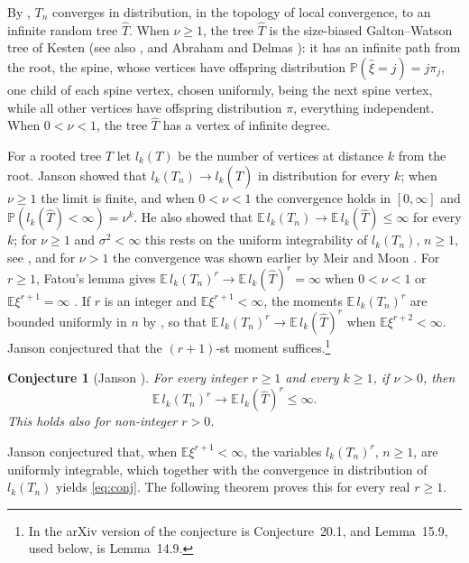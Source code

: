 \documentclass[11pt]{amsart}
\newtheorem*{conjecture*}{Conjecture}
\theoremstyle{remark}
\numberwithin{equation}{section}
\newcommand{\Pp}{\mathbb P}
\newcommand{\E}{\mathbb E}
\newcommand{\hT}{\widehat T}
\begin{document}
By \cite[Theorem~7.1]{J12}, $T_n$ converges in distribution, in the topology of local convergence, to an infinite random tree $\hT$. When $\nu\ge1$, the tree $\hT$ is the size-biased Galton--Watson tree of Kesten \cite{Kes86} (see also \cite{LPP95}, \cite[Section~5]{J12} and Abraham and Delmas \cite{AD14}): it has an infinite path from the root, the spine, whose vertices have offspring distribution $\Pp(\hat\xi=j)=j\pi_j$, one child of each spine vertex, chosen uniformly, being the next spine vertex, while all other vertices have offspring distribution $\pi$, everything independent. When $0<\nu<1$, the tree $\hT$ has a vertex of infinite degree.

For a rooted tree $T$ let $l_k(T)$ be the number of vertices at distance $k$ from the root. Janson \cite[Section~21.1]{J12} showed that $l_k(T_n)\to l_k(\hT)$ in distribution for every $k$; when $\nu\ge1$ the limit is finite, and when $0<\nu<1$ the convergence holds in $[0,\infty]$ and $\Pp(l_k(\hT)<\infty)=\nu^k$. He also showed that $\E\, l_k(T_n)\to\E\, l_k(\hT)\le\infty$ for every $k$; for $\nu\ge1$ and $\sigma^2<\infty$ this rests on the uniform integrability of $l_k(T_n)$, $n\ge1$, see \cite[Section~10]{J06}, and for $\nu>1$ the convergence was shown earlier by Meir and Moon \cite{MM78}. For $r\ge1$, Fatou's lemma gives $\E\, l_k(T_n)^r\to\E\, l_k(\hT)^r=\infty$ when $0<\nu<1$ or $\E\xi^{r+1}=\infty$ \cite[Section~21.1]{J12}. If $r$ is an integer and $\E\xi^{r+1}<\infty$, the moments $\E\, l_k(T_n)^r$ are bounded uniformly in $n$ by \cite[Theorem~1.13]{J06}, so that $\E\, l_k(T_n)^r\to\E\, l_k(\hT)^r$ when $\E\xi^{r+2}<\infty$. Janson conjectured that the $(r+1)$-st moment suffices.\footnote{In the arXiv version of \cite{J12} the conjecture is Conjecture~20.1, and Lemma~15.9, used below, is Lemma~14.9.}

\begin{conjecture*}[{Janson \cite[Conjecture~21.1]{J12}}]
For every integer $r\ge1$ and every $k\ge1$, if $\nu>0$, then
\begin{equation}\label{eq:conj}
\E\, l_k(T_n)^r\to\E\, l_k(\hT)^r\le\infty.
\end{equation}
This holds also for non-integer $r>0$.
\end{conjecture*}

Janson conjectured that, when $\E\xi^{r+1}<\infty$, the variables $l_k(T_n)^r$, $n\ge1$, are uniformly integrable, which together with the convergence in distribution of $l_k(T_n)$ yields \eqref{eq:conj}. The following theorem proves this for every real $r\ge1$.
\end{document}
